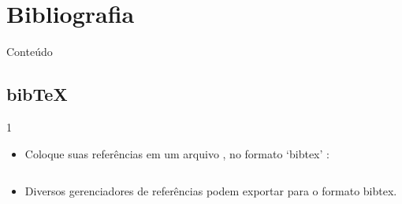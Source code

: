\documentclass[xcolor=table]{beamer}
\begin{document}

\section{Bibliografia}

\begin{frame}{Conteúdo}
\begin{multicols}{2}
	\tableofcontents[currentsection]
\end{multicols}
\end{frame}

\subsection{bib\TeX}
\begin{frame}[fragile]{\insertsubsection{} 1}
	\begin{itemize}
		\item Coloque suas referências em um arquivo , no formato `bibtex' :
		\inputminted[fontsize=\scriptsize,frame=single]{latex}{bib-example.bib}
		\item Diversos gerenciadores de referências podem exportar para o formato bibtex.
	\end{itemize}
\end{frame}
\end{document}
